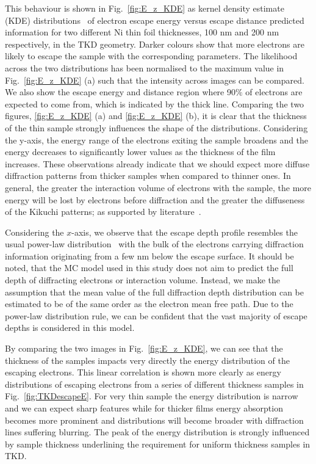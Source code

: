 This behaviour is shown in Fig.~\ref{fig:E_z_KDE} as kernel density estimate (KDE) distributions~\cite{KDE} of electron escape energy versus escape distance predicted information for two different Ni thin foil thicknesses, 100 nm and 200 nm respectively, in the TKD geometry. Darker colours show that more electrons are likely to escape the sample with the corresponding parameters. The likelihood  across the two distributions has been normalised to the maximum value in Fig.~\ref{fig:E_z_KDE} (a) such that the intensity across images can be compared. We also show the escape energy and distance region where 90$\%$ of electrons are expected to come from, which is indicated by the thick line. Comparing the two figures, \ref{fig:E_z_KDE} (a) and \ref{fig:E_z_KDE} (b), it is clear that the thickness of the thin sample strongly influences the shape of the distributions. Considering the y-axis, the energy range of the electrons exiting the sample broadens and the energy decreases to significantly lower values as the thickness of the film increases. These observations already indicate that we should expect more diffuse diffraction patterns from thicker samples when compared to thinner ones. In general, the greater the interaction volume of electrons with the sample, the more energy will be lost by electrons before diffraction and the greater the diffuseness of the Kikuchi patterns; as supported by literature~\cite{rice2014}. 

Considering the $x$-axis, we observe that the escape depth profile resembles the usual power-law distribution~\cite{winkelmann2016} with the bulk of the electrons carrying diffraction information originating from a few nm below the escape surface. It should be noted, that the MC model used in this study does not aim to predict the full depth of diffracting electrons or interaction volume. Instead, we make the assumption that the mean value of the full diffraction depth distribution can be estimated to be of the same order as the electron mean free path. Due to the power-law distribution rule, we can be confident that the vast majority of escape depths is considered in this model.

By comparing the two images in Fig.~\ref{fig:E_z_KDE}, we can see that the thickness of the samples impacts very directly the energy distribution of the escaping electrons. This linear correlation is shown more clearly as energy distributions of escaping electrons from a series of different thickness samples in Fig.~\ref{fig:TKDescapeE}. For very thin sample the energy distribution is narrow and we can expect sharp features while for thicker films energy absorption becomes more prominent and distributions will become broader with diffraction lines suffering blurring. The peak of the energy distribution is strongly influenced by sample thickness underlining the requirement for uniform thickness samples in TKD.

